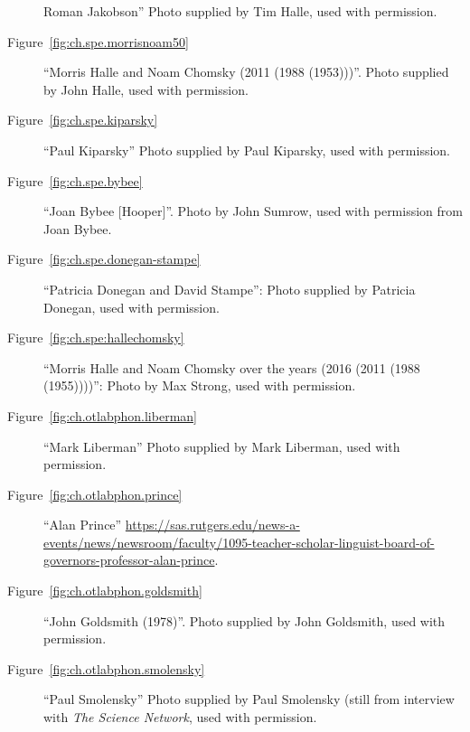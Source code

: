 \begin{description}
  Roman Jakobson'' Photo supplied by Tim Halle, used with
  permission.
\item[Figure~\ref{fig:ch.spe.morrisnoam50}] ``Morris Halle and Noam
  Chomsky (2011 (1988 (1953)))''. Photo supplied by John Halle, used
  with permission.
\item[Figure~\ref{fig:ch.spe.kiparsky}] ``Paul Kiparsky'' Photo
  supplied by Paul Kiparsky, used with permission.
\item[Figure~\ref{fig:ch.spe.bybee}] ``Joan Bybee [Hooper]''. Photo
  by John Sumrow, used with permission from Joan Bybee.
\item[Figure~\ref{fig:ch.spe.donegan-stampe}] ``Patricia Donegan and
  David Stampe'': Photo supplied by Patricia Donegan, used with permission.
\item[Figure~\ref{fig:ch.spe:hallechomsky}] ``Morris Halle and Noam
  Chomsky over the years (2016 (2011 (1988 (1955))))'': Photo by Max
  Strong, used with permission.
\item[Figure~\ref{fig:ch.otlabphon.liberman}] ``Mark Liberman'' Photo
supplied by Mark Liberman, used with permission.
\item[Figure~\ref{fig:ch.otlabphon.prince}] ``Alan Prince'' \url{https://sas.rutgers.edu/news-a-events/news/newsroom/faculty/1095-teacher-scholar-linguist-board-of-governors-professor-alan-prince}.
\item[Figure~\ref{fig:ch.otlabphon.goldsmith}] ``John Goldsmith
  (1978)''. Photo supplied by John Goldsmith, used with permission.
\item[Figure~\ref{fig:ch.otlabphon.smolensky}] ``Paul Smolensky''
  Photo supplied by Paul Smolensky (still from interview with
  \textsl{The Science Network}, used with permission.
\end{description}


